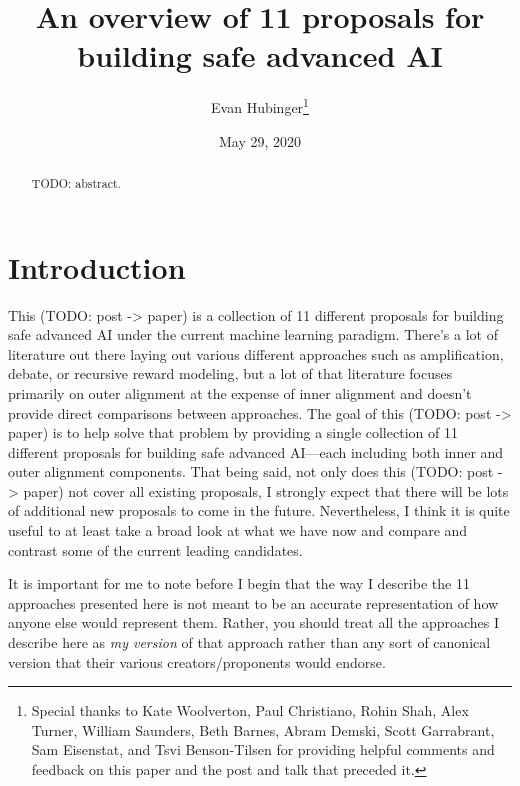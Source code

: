 \documentclass[
  onecolumn,
  natbib,
]{miri-tech-article}
\begin{document}
\title{An overview of 11 proposals for building safe advanced AI}
\author{Evan Hubinger\thanks{Special thanks to Kate Woolverton, Paul Christiano, Rohin Shah, Alex Turner, William Saunders, Beth Barnes, Abram Demski, Scott Garrabrant, Sam Eisenstat, and Tsvi Benson-Tilsen for providing helpful comments and feedback on this paper and the post and talk that preceded it.}}

\date{May 29, 2020}

\maketitle

\begin{abstract}
TODO: abstract.
\end{abstract}

\tableofcontents

\section{Introduction}
\label{sec:0}

This (TODO: post -> paper) is a collection of 11 different proposals for building safe advanced AI under the current machine learning paradigm. There's a lot of literature out there laying out various different approaches such as amplification\cite{TODO: cite https://www.alignmentforum.org/s/EmDuGeRw749sD3GKd}, debate\cite{TODO: cite https://openai.com/blog/debate}, or recursive reward modeling\cite{TODO: cite https://medium.com/@deepmindsafetyresearch/scalable-agent-alignment-via-reward-modeling-bf4ab06dfd84}, but a lot of that literature focuses primarily on outer alignment at the expense of inner alignment\cite{TODO: cite https://arxiv.org/abs/1906.01820} and doesn't provide direct comparisons between approaches. The goal of this (TODO: post -> paper) is to help solve that problem by providing a single collection of 11 different proposals for building safe advanced AI---each including both inner and outer alignment components. That being said, not only does this (TODO: post -> paper) not cover all existing proposals, I strongly expect that there will be lots of additional new proposals to come in the future. Nevertheless, I think it is quite useful to at least take a broad look at what we have now and compare and contrast some of the current leading candidates.

It is important for me to note before I begin that the way I describe the 11 approaches presented here is not meant to be an accurate representation of how anyone else would represent them. Rather, you should treat all the approaches I describe here as \textit{my version} of that approach rather than any sort of canonical version that their various creators/proponents would endorse.
\end{document}
